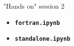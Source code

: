 \begin{frame}{"Hands on" session 2}
\begin{itemize}
\itemsep5em
\item
\textbf{\color{DarkBlue}\texttt{fortran.ipynb}}

\item
\textbf{\color{DarkBlue}\texttt{standalone.ipynb}}
\end{itemize}
\end{frame}
